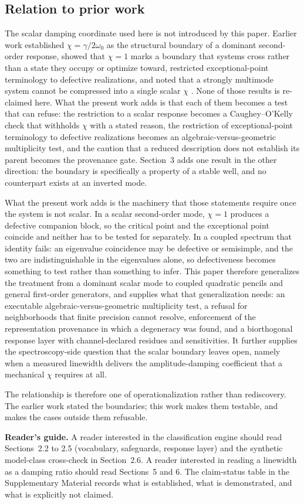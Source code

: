 \subsection{Relation to prior work}

The scalar damping coordinate used here is not introduced by this paper. Earlier work established \(\chi = \gamma/2\omega_0\) as the structural boundary of a dominant second-order response, showed that \(\chi = 1\) marks a boundary that systems cross rather than a state they occupy or optimize toward, restricted exceptional-point terminology to defective realizations, and noted that a strongly multimode system cannot be compressed into a single scalar \(\chi\) \citep{stabilityarch}. None of those results is re-claimed here. What the present work adds is that each of them becomes a test that can refuse: the restriction to a scalar response becomes a Caughey--O'Kelly check that withholds \(\chi\) with a stated reason, the restriction of exceptional-point terminology to defective realizations becomes an algebraic-versus-geometric multiplicity test, and the caution that a reduced description does not establish its parent becomes the provenance gate. Section~3 adds one result in the other direction: the boundary is specifically a property of a stable well, and no counterpart exists at an inverted mode.

What the present work adds is the machinery that those statements require once the system is not scalar. In a scalar second-order mode, \(\chi = 1\) produces a defective companion block, so the critical point and the exceptional point coincide and neither has to be tested for separately. In a coupled spectrum that identity fails: an eigenvalue coincidence may be defective or semisimple, and the two are indistinguishable in the eigenvalues alone, so defectiveness becomes something to test rather than something to infer. This paper therefore generalizes the treatment from a dominant scalar mode to coupled quadratic pencils and general first-order generators, and supplies what that generalization needs: an executable algebraic-versus-geometric multiplicity test, a refusal for neighborhoods that finite precision cannot resolve, enforcement of the representation provenance in which a degeneracy was found, and a biorthogonal response layer with channel-declared residues and sensitivities. It further supplies the spectroscopy-side question that the scalar boundary leaves open, namely when a measured linewidth delivers the amplitude-damping coefficient that a mechanical \(\chi\) requires at all.

The relationship is therefore one of operationalization rather than rediscovery. The earlier work stated the boundaries; this work makes them testable, and makes the cases outside them refusable.

\noindent\textbf{Reader's guide.} A reader interested in the classification engine should read Sections~2.2 to 2.5 (vocabulary, safeguards, response layer) and the synthetic model-class cross-check in Section~2.6. A reader interested in reading a linewidth as a damping ratio should read Sections~5 and 6. The claim-status table in the Supplementary Material records what is established, what is demonstrated, and what is explicitly not claimed.
